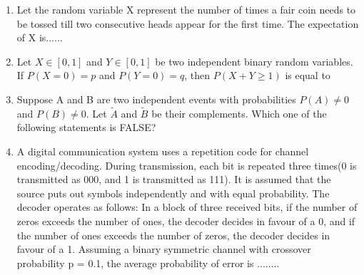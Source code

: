 \documentclass[journal,12pt,twocolumn]{IEEEtran}
\begin{document}
\begin{enumerate}
\begin{enumerate}
\begin{multicols}{4}
\end{multicols}
\end{enumerate}


\item Let the random variable X represent the number of times a fair coin needs to be tossed till two consecutive heads appear for the first time. The expectation of X is......

\item Let $X\in[0,1]$ and $Y\in[0,1]$ be two independent binary random variables. If $P(X=0) = p$ and $P(Y=0) = q$, then $P(X+Y\geqslant1)$ is equal to

\begin{enumerate}
\end{enumerate}

\item Suppose A and B are two independent events with probabilities $P(A)\neq 0$ and $P(B)\neq0$. Let $\widetilde A$ and $\widetilde B$ be their complements. Which one of the following statements is FALSE?

\begin{enumerate}
\end{enumerate}
\solution

\item A digital communication system uses a repetition code for channel encoding/decoding. During transmission, each bit is repeated three times(0 is transmitted as 000, and 1 is transmitted as 111). It is assumed that the source puts out symbols independently and with equal probability. The decoder operates as follows: In a block of three received bits, if the number of zeros exceeds the number of ones, the decoder decides in favour of a 0, and if the number of ones exceeds the number of zeros, the decoder decides in favour of a 1. Assuming a binary symmetric channel with crossover probability p = 0.1, the average probability of error is ........
%
\\
\solution



\end{enumerate}
\end{document}
